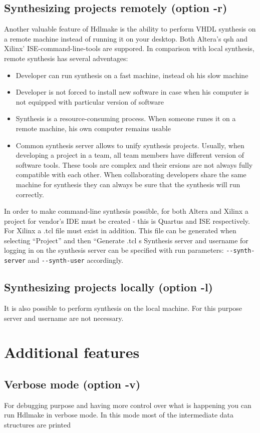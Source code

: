 \documentclass[a4paper,11pt]{article}
\begin{document}
\subsection*{Synthesizing projects remotely (option -r)}
Another valuable feature of Hdlmake is the ability to perform VHDL synthesis on a remote machine instead of running it on your desktop. Both Altera's qsh and Xilinx' ISE-command-line-tools are suppored. In comparison with local synthesis, remote synthesis has several adventages:
\begin{itemize}
\item Developer can run synthesis on a fast machine, instead oh his slow machine
\item Developer is not forced to install new software in case when his computer is not equipped with particular version of software
\item Synthesis is a resource-consuming process. When someone runes it on a remote machine, his own computer remains usable
\item Common synthesis server allows to unify synthesis projects. Usually, when developing a project in a team, all team members have different version of software tools. These tools are complex and their ersions are not always fully compatible with each other. When collaborating developers share the same machine for synthesis they can always be sure that the synthesis will run correctly.
\end{itemize}
In order to make command-line synthesis possible, for both Altera and Xilinx a project for vendor's IDE must be created - this is Quartus and ISE respectively. For Xilinx a .tcl file must exist in addition. This file can be generated when selecting ``Project'' and then ``Generate .tcl s
Synthesis server and username for logging in on the synthesis server can be specified with run parameters: \verb!--synth-server! and \verb!--synth-user! accordingly.


\subsection*{Synthesizing projects locally (option -l)}
It is also possible to perform synthesis on the local machine. For this purpose server and username are not necessary.
\section{Additional features}
\subsection*{Verbose mode (option -v)}
For debugging purpose and having more control over what is happening you can run Hdlmake in verbose mode. In this mode most of the intermediate data structures are printed 
\end{document}
